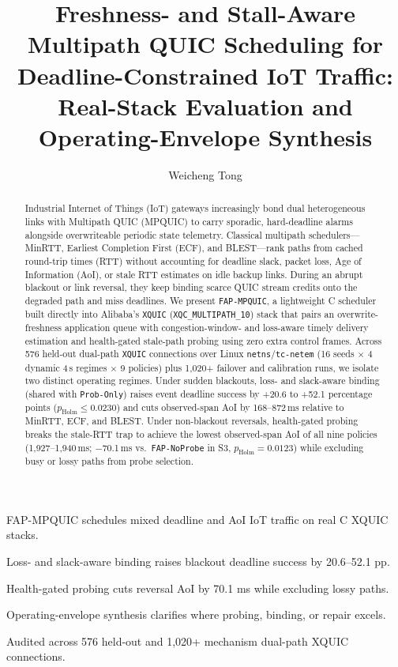 \documentclass[preprint,12pt,number]{elsarticle}
\begin{document}
\begin{frontmatter}

\title{Freshness- and Stall-Aware Multipath QUIC Scheduling for Deadline-Constrained IoT Traffic: Real-Stack Evaluation and Operating-Envelope Synthesis}

\author[1]{Weicheng Tong}


\begin{abstract}
Industrial Internet of Things (IoT) gateways increasingly bond dual heterogeneous links with Multipath QUIC (MPQUIC) to carry sporadic, hard-deadline alarms alongside overwriteable periodic state telemetry. Classical multipath schedulers---MinRTT, Earliest Completion First (ECF), and BLEST---rank paths from cached round-trip times (RTT) without accounting for deadline slack, packet loss, Age of Information (AoI), or stale RTT estimates on idle backup links. During an abrupt blackout or link reversal, they keep binding scarce QUIC stream credits onto the degraded path and miss deadlines. We present \texttt{FAP-MPQUIC}, a lightweight C scheduler built directly into Alibaba's \texttt{XQUIC} (\texttt{XQC\_MULTIPATH\_10}) stack that pairs an overwrite-freshness application queue with congestion-window- and loss-aware timely delivery estimation and health-gated stale-path probing using zero extra control frames. Across 576 held-out dual-path \texttt{XQUIC} connections over Linux \texttt{netns}/\texttt{tc-netem} (16 seeds $\times$ 4 dynamic 4\,s regimes $\times$ 9 policies) plus 1,020+ failover and calibration runs, we isolate two distinct operating regimes. Under sudden blackouts, loss- and slack-aware binding (shared with \texttt{Prob-Only}) raises event deadline success by +20.6 to +52.1 percentage points ($p_{\text{Holm}} \le 0.0230$) and cuts observed-span AoI by 168--872\,ms relative to MinRTT, ECF, and BLEST. Under non-blackout reversals, health-gated probing breaks the stale-RTT trap to achieve the lowest observed-span AoI of all nine policies (1,927--1,940\,ms; $-$70.1\,ms vs.\ \texttt{FAP-NoProbe} in S3, $p_{\text{Holm}}=0.0123$) while excluding busy or lossy paths from probe selection.
\end{abstract}

\begin{highlights}
\item FAP-MPQUIC schedules mixed deadline and AoI IoT traffic on real C XQUIC stacks.
\item Loss- and slack-aware binding raises blackout deadline success by 20.6--52.1 pp.
\item Health-gated probing cuts reversal AoI by 70.1 ms while excluding lossy paths.
\item Operating-envelope synthesis clarifies where probing, binding, or repair excels.
\item Audited across 576 held-out and 1,020+ mechanism dual-path XQUIC connections.
\end{highlights}


\end{frontmatter}
\end{document}

